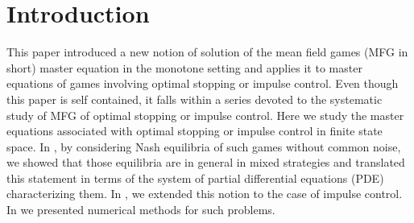 \documentclass[JEP,XML,SOM,Unicode,NoEqCountersInSection,published]{cedram}
\theoremstyle{definition}
\begin{document}
\section*{Introduction}
This paper introduced a new notion of solution of the mean field games (MFG in short) master equation in the monotone setting and applies it to master equations of games involving optimal stopping or impulse control. Even though this paper is self contained, it falls within a series devoted to the systematic study of MFG of optimal stopping or impulse control. Here we study the master equations associated with optimal stopping or impulse control in finite state space. In \cite{bertucci2018optimal}, by considering Nash equilibria of such games without common noise, we showed that those equilibria are in general in mixed strategies and translated this statement in terms of the system of partial differential equations (PDE) characterizing them. In \cite{bertucci2020fokker}, we extended this notion to the case of impulse control. In \cite{bertucci2020remark} we presented numerical methods for such problems.
\end{document}

